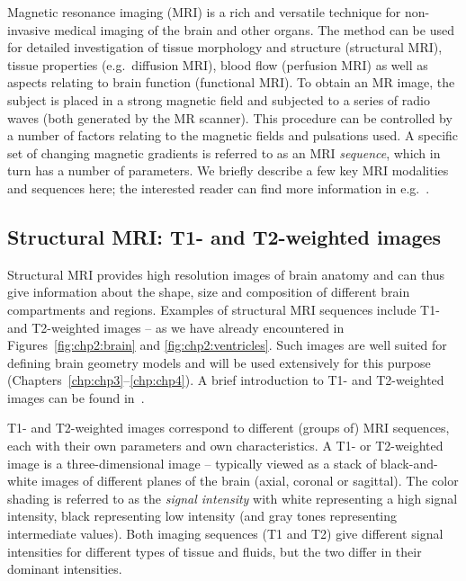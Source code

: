 
Magnetic resonance imaging (MRI) is a rich and versatile technique for
non-invasive medical imaging of the brain and other organs. The method
can be used for detailed investigation of tissue morphology and
structure (structural MRI), tissue properties (e.g.~diffusion MRI),
blood flow (perfusion MRI) as well as aspects relating to brain
function (functional MRI). To obtain an MR image, the subject is
placed in a strong magnetic field and subjected to a series of radio
waves (both generated by the MR scanner). This procedure can be
controlled by a number of factors relating to the magnetic fields and
pulsations used. A specific set of changing magnetic gradients is
referred to as an MRI \emph{sequence}, which in turn has a number of
parameters. We briefly describe a few key MRI modalities and sequences
here; the interested reader can find more information in
e.g.~\cite{haacke1999magnetic, payne2017cerebral, alexander2007diffusion}.

\subsection{Structural MRI: T1- and T2-weighted images}
\label{sec:T1T2}

Structural MRI provides high resolution images of brain anatomy and
can thus give information about the shape, size and composition of
different brain compartments and regions. Examples of structural MRI
sequences include T1- and T2-weighted images -- as we have already
encountered in Figures~\ref{fig:chp2:brain} and
\ref{fig:chp2:ventricles}. Such images are well suited for defining
brain geometry models and will be used extensively for this purpose
(Chapters~\ref{chp:chp3}--\ref{chp:chp4}). A brief introduction to T1-
and T2-weighted images can be found in~\cite{pooley2005fundamental}.

T1- and T2-weighted images correspond to different (groups of) MRI
sequences, each with their own parameters and own characteristics.  A
T1- or T2-weighted image is a three-dimensional image -- typically
viewed as a stack of black-and-white images of different planes of the
brain (axial, coronal or sagittal). The color shading is referred to
as the \emph{signal intensity} with white representing a high signal
intensity, black representing low intensity (and gray tones
representing intermediate values). Both imaging sequences (T1 and T2)
give different signal intensities for different types of tissue and
fluids, but the two differ in their dominant intensities.

